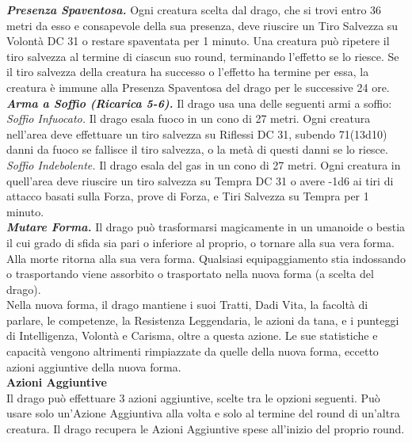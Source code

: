 \begin{multicols}{2}
\emph{\textbf{Presenza Spaventosa.}} Ogni creatura scelta dal drago, che si trovi entro 36 metri da esso e consapevole della sua presenza, deve riuscire un Tiro Salvezza su Volontà DC  31 o restare spaventata per 1 minuto. Una creatura può ripetere il tiro salvezza al termine di ciascun suo round, terminando l'effetto se lo riesce. Se il tiro salvezza della creatura ha successo o l'effetto ha termine per essa, la creatura è immune alla Presenza Spaventosa del drago per le successive 24 ore. \\
\emph{\textbf{Arma a Soffio (Ricarica 5-6).}} Il drago usa una delle seguenti armi a soffio:\\
\emph{Soffio Infuocato.} Il drago esala fuoco in un cono di 27 metri. Ogni creatura nell'area deve effettuare un tiro salvezza su Riflessi DC  31, subendo 71(13d10) danni da fuoco se fallisce il tiro salvezza, o la metà di questi danni se lo riesce.\\

\emph{Soffio Indebolente.} Il drago esala del gas in un cono di 27 metri. Ogni creatura in quell'area deve riuscire un tiro salvezza su Tempra DC  31 o avere -1d6 ai tiri di attacco basati sulla Forza, prove di Forza, e Tiri Salvezza su Tempra per 1 minuto.\\
\emph{\textbf{Mutare Forma.}} Il drago può trasformarsi magicamente in un umanoide o bestia il cui grado di sfida sia pari o inferiore al proprio, o tornare alla sua vera forma. Alla morte ritorna alla sua vera forma. Qualsiasi equipaggiamento stia indossando o trasportando viene assorbito o trasportato nella nuova forma (a scelta del drago).\\
Nella nuova forma, il drago mantiene i suoi Tratti, Dadi Vita, la facoltà di parlare, le competenze, la Resistenza Leggendaria, le azioni da tana, e i punteggi di Intelligenza, Volontà e Carisma, oltre a questa azione. Le sue statistiche e capacità vengono altrimenti rimpiazzate da quelle della nuova forma, eccetto azioni aggiuntive della nuova forma.\\
\textbf{Azioni Aggiuntive}\\
Il drago può effettuare 3 azioni aggiuntive, scelte tra le opzioni seguenti. Può usare solo un'Azione Aggiuntiva alla volta e solo al termine del round di un'altra creatura. Il drago recupera le Azioni Aggiuntive spese all'inizio del proprio round.\\


\end{multicols}
